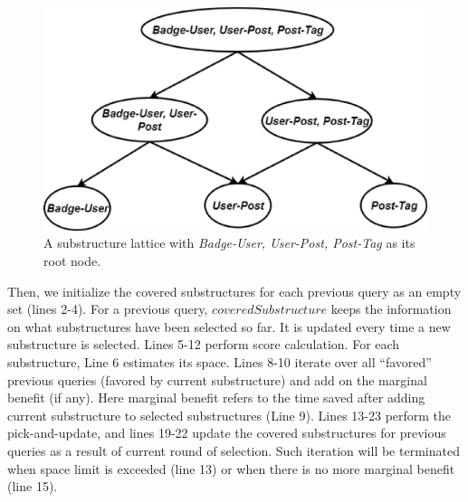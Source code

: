 \begin {figure}[h]
\centering
\includegraphics[scale=0.4]{pic/Structurelattice.eps}
\caption{A substructure lattice with \textit{Badge-User, User-Post, Post-Tag} as its root node.}
\label{fig:4:3}
\end{figure}


Then, we initialize the covered substructures for each previous query as an empty set (lines 2-4). For a previous query, $coveredSubstructure$ keeps the information on what substructures have been selected so far. %
It is updated every time a new substructure is selected. Lines 5-12 perform score calculation. For each substructure, Line 6 estimates its space. Lines 8-10 iterate over all ``favored'' previous queries (favored by current substructure) and add on the marginal benefit (if any). Here marginal benefit refers to the time saved after adding current substructure to selected substructures (Line 9). Lines 13-23 perform the pick-and-update, and lines 19-22 update the covered substructures for previous queries as a result of current round of selection. Such iteration will be terminated when space limit is exceeded (line 13) or when there is no more marginal benefit (line 15).

